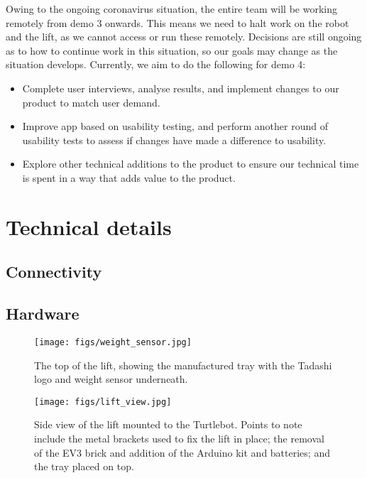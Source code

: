 \documentclass{article}
\begin{document}
Owing to the ongoing coronavirus situation, the entire team will be working remotely from demo 3 onwards. This means we need to halt work on the robot and the lift, as we cannot access or run these remotely. Decisions are still ongoing as to how to continue work in this situation, so our goals may change as the situation develops. Currently, we aim to do the following for demo 4:
\begin{itemize}
  \item Complete user interviews, analyse results, and implement changes to our product to match user demand.
  \item Improve app based on usability testing, and perform another round of usability tests to assess if changes have made a difference to usability. 
  \item Explore other technical additions to the product to ensure our technical time is spent in a way that adds value to the product. 
\end{itemize}

\section{Technical details}
\subsection{Connectivity}

\subsection{Hardware}
\begin{figure}
  \begin{center}
    \texttt{[image: figs/weight\_sensor.jpg]}
    \caption{The top of the lift, showing the manufactured tray with the Tadashi logo and weight sensor underneath.}
  \label{fig:sensor}
  \end{center}
\end{figure}

\begin{figure}
  \begin{center}
    \texttt{[image: figs/lift\_view.jpg]}
    \caption{Side view of the lift mounted to the Turtlebot. Points to note include the metal brackets used to fix the lift in place; the removal of the EV3 brick and addition of the Arduino kit and batteries; and the tray placed on top.}
  \label{fig:lift}
  \end{center}
\end{figure}
\end{document}
